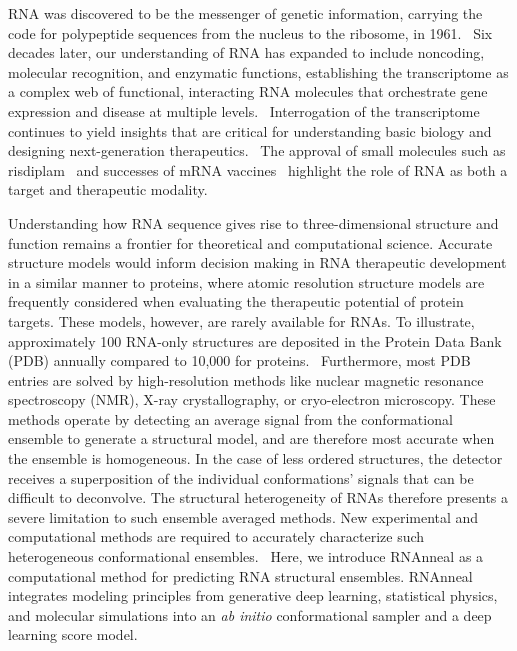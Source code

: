 
%
%


RNA was discovered to be the messenger of genetic information, carrying the code for polypeptide sequences from the nucleus to the ribosome, in 1961.~\cite{brenner1961unstable} Six decades later, our understanding of RNA has expanded to include noncoding, molecular recognition, and enzymatic functions, establishing the transcriptome as a complex web of functional, interacting RNA molecules that orchestrate gene expression and disease at multiple levels.~\cite{wan2011understanding} Interrogation of the transcriptome continues to yield insights that are critical for understanding basic biology and designing next-generation therapeutics.~\cite{saw2024advancements,childs2022targeting} The approval of small molecules such as risdiplam~\cite{ratni2018discovery} and successes of mRNA vaccines~\cite{pardi2018mrna,jackson2020mrna} highlight the role of RNA as both a target and therapeutic modality.

Understanding how RNA sequence gives rise to three-dimensional structure and function remains a frontier for theoretical and computational science. Accurate structure models would inform decision making in RNA therapeutic development in a similar manner to proteins, where atomic resolution structure models are frequently considered when evaluating the therapeutic potential of protein targets. These models, however, are rarely available for RNAs. To illustrate, approximately 100 RNA-only structures are deposited in the Protein Data Bank (PDB) annually compared to 10,000 for proteins.~\cite{berman2000protein} Furthermore, most PDB entries are solved by high-resolution methods like nuclear magnetic resonance spectroscopy (NMR), X-ray crystallography, or cryo-electron microscopy. These methods operate by detecting an average signal from the conformational ensemble to generate a structural model, and are therefore most accurate when the ensemble is homogeneous. In the case of less ordered structures, the detector receives a superposition of the individual conformations' signals that can be difficult to deconvolve. The structural heterogeneity of RNAs therefore presents a severe limitation to such ensemble averaged methods. New experimental and computational methods are required to accurately characterize such heterogeneous conformational ensembles.~\cite{morandi2021genome,ding2023visualizing,bowman2024alphafold} Here, we introduce RNAnneal as a computational method for predicting RNA structural ensembles. RNAnneal integrates modeling principles from generative deep learning, statistical physics, and molecular simulations into an {\it ab initio }conformational sampler and a deep learning score model.

